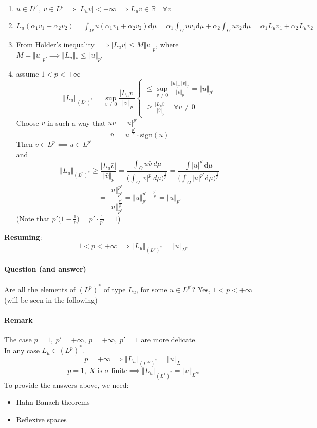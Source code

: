 \begin{enumerate}
    \item $u\in L^{p'},\ v\in L^p\implies |L_uv|<+\infty\implies L_uv\in \mathbb R \quad \forall v$
    \item $L_u(\alpha_1v_1+\alpha_2v_2)=\int_\Omega u (\alpha_1v_1+\alpha_2v_2)\mathrm d\mu=\alpha_1 \int_\Omega uv_1\mathrm d\mu+\alpha_2\int_\Omega uv_2\mathrm d\mu=\alpha_1L_uv_1+\alpha_2L_uv_2$
    \item From Hölder's inequality $\implies |L_uv|\leq M\Vert v\Vert_p$, where $M=\Vert u\Vert _{p'} \implies \Vert L_u\Vert _*\leq \Vert u\Vert _{p'}$
    \item assume $1<p<+\infty$
    $$\Vert L_u\Vert_{(L^p)^*}=\sup_{v\neq 0} \frac{|L_uv|}{\Vert v\Vert _p}\begin{cases}
        \leq \sup_{v\neq 0} \frac{\Vert u\Vert _{p'}\Vert v\Vert _p}{\Vert v\Vert _p}=\Vert u\Vert _{p'}\\
        \geq \frac{|L_u\bar v|}{\Vert \bar v\Vert_p} \quad \forall \bar v\neq 0
    \end{cases}$$
    Choose $\bar v$ in such a way that $u\bar v=|u|^{p'}$
    $$\bar v = |u|^{\frac{p'}p}\cdot \mathrm{sign}(u)$$
    Then $\bar v\in L^p\impliedby u \in L^{p'}$\\
    and $$\Vert L_u\Vert_{(L^p)^*}\geq \frac{|L_u\bar v |}{\Vert \bar v\Vert_p}= \frac{\int_\Omega u\bar v\mathrm\ d\mu}{\Big (\int_\Omega |\bar v|^p\mathrm\  d\mu\Big )^{\frac 1p}}=\frac{\int |u|^{p'}\mathrm d\mu}{\Big (\int_\Omega |u|^{p'}\mathrm d\mu \Big )^{\frac 1p}}$$
    $$ = \frac{\Vert u\Vert_{p'}^{p'}}{\Vert u\Vert _{p'}^{\frac {p'}p}}=\Vert u\Vert _{p'}^{p'-\frac{p'}p}=\Vert u\Vert_{p'}$$
    (Note that $p'\Big (1-\frac 1p\Big )=p'\cdot \frac 1{p'}=1$)
    
\end{enumerate}

\textbf{Resuming}:
$$ 1<p<+\infty \implies \Vert L_u\Vert_{(L^p)^*}=\Vert u\Vert _{L^{p'}}$$
\paragraph{Question (and answer)}
Are all the elements of $(L^p)^*$ of type $L_u$, for some $u\in L^{p'}$? Yes, $1<p<+\infty$ (will be seen in the following)-
\paragraph{Remark}
The case $p=1,\ p'=+\infty,\ p=+\infty,\ p'=1$ are more delicate.\\In any case $L_u\in (L^p)^*$.
$$p=+\infty\implies \Vert L_u\Vert_{(L^\infty)^*}=\Vert u \Vert_{L^1}$$
$$p=1,\ X\text{ is }\sigma\text{-finite}\implies \Vert L_u\Vert_{(L^1)^*}=\Vert u\Vert_{L^\infty}$$
To provide the answers above, we need:
\begin{itemize}
    \item Hahn-Banach theorems
    \item Reflexive spaces
\end{itemize}
